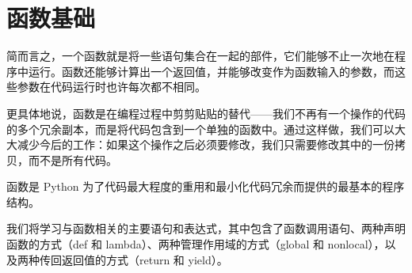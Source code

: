 \chapter{函数基础\label{ch16}}
简而言之，一个函数就是将一些语句集合在一起的部件，它们能够不止一次地在程序中运行。函数还能够计算出一个返回值，并能够改变作为函数输入的参数，而这些参数在代码运行时也许每次都不相同。

更具体地说，函数是在编程过程中剪剪贴贴的替代——我们不再有一个操作的代码的多个冗余副本，而是将代码包含到一个单独的函数中。通过这样做，我们可以大大减少今后的工作：如果这个操作之后必须要修改，我们只需要修改其中的一份拷贝，而不是所有代码。

函数是 Python 为了代码最大程度的重用和最小化代码冗余而提供的最基本的程序结构。

我们将学习与函数相关的主要语句和表达式，其中包含了函数调用语句、两种声明函数的方式（def 和 lambda）、两种管理作用域的方式（global 和 nonlocal），以及两种传回返回值的方式（return 和 yield）。
